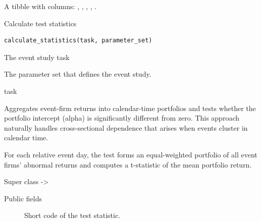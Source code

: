 \documentclass[a4paper]{book}
\begin{document}
%
\begin{Value}
A tibble with columns: , ,
, , .
\end{Value}
%
\begin{Description}
Calculate test statistics
\end{Description}
%
\begin{Usage}
\begin{verbatim}
calculate_statistics(task, parameter_set)
\end{verbatim}
\end{Usage}
%
\begin{Arguments}
\begin{ldescription}
\item[\code{task}] The event study task

\item[\code{parameter\_set}] The parameter set that defines the event study.
\end{ldescription}
\end{Arguments}
%
\begin{Value}
task
\end{Value}
%
\begin{Description}
Aggregates event-firm returns into calendar-time portfolios and tests
whether the portfolio intercept (alpha) is significantly different from
zero. This approach naturally handles cross-sectional dependence that
arises when events cluster in calendar time.

For each relative event day, the test forms an equal-weighted portfolio
of all event firms' abnormal returns and computes a t-statistic of the
mean portfolio return.
\end{Description}
%
\begin{Section}{Super class}
 -> 
\end{Section}
%
\begin{Section}{Public fields}

\begin{description}

\item[] Short code of the test statistic.

\end{description}


\end{Section}
\end{document}
